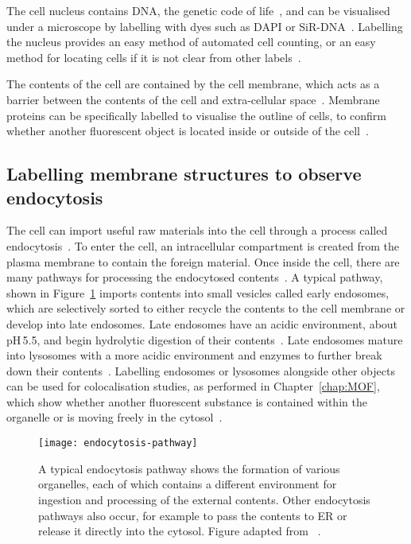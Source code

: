 The cell nucleus contains DNA, the genetic code of life~\cite{alberts2002molecular}, and can be visualised under a microscope by labelling with dyes such as DAPI or SiR-DNA~\cite{kapuscinski1995dapi, lukinavivcius2015sir}. 
Labelling the nucleus provides an easy method of automated cell counting, or an easy method for locating cells if it is not clear from other labels~\cite{porter1980use}. 

The contents of the cell are contained by the cell membrane, which acts as a barrier between the contents of the cell and extra-cellular space~\cite[\textit{ch. 1}]{alberts2013essential}. 
Membrane proteins can be specifically labelled to visualise the outline of cells, to confirm whether another fluorescent object is located inside or outside of the cell~\cite{yano2009tag, lee2011fluorescent, chamma2017optimized}. 

\subsection{Labelling membrane structures to observe endocytosis}
The cell can import useful raw materials into the cell through a process called endocytosis~\cite{alberts2002molecular}. 
To enter the cell, an intracellular compartment is created from the plasma membrane to contain the foreign material.
Once inside the cell, there are many pathways for processing the endocytosed contents~\cite{marsh2001endocytosis, marsh1999structural, mcmahon2011molecular}. 
A typical pathway, shown in Figure~\ref{fig:endocytosis-pathway} imports contents into small vesicles called early endosomes, which are selectively sorted to either recycle the contents to the cell membrane or develop into late endosomes. 
Late endosomes have an acidic environment, about pH\,\num{5.5}, and begin hydrolytic digestion of their contents~\cite{geisow1984ph}. 
Late endosomes mature into lysosomes with a more acidic environment and enzymes to further break down their contents~\cite{alberts2002molecular}. 
Labelling endosomes or lysosomes alongside other objects can be used for colocalisation studies, as performed in Chapter~\ref{chap:MOF}, which show whether another fluorescent substance is contained within the organelle or is moving freely in the cytosol~\cite{pike2017quantifying}. 

\begin{figure}[htbp!]
\centering
\texttt{[image: endocytosis-pathway]}
\captionsetup{singlelinecheck=off}
\caption[Introduction: Cells import external contents through endocytosis]{A typical endocytosis pathway shows the formation of various organelles, each of which contains a different environment for ingestion and processing of the external contents. Other endocytosis pathways also occur, for example to pass the contents to ER or release it directly into the cytosol. Figure adapted from ~\cite{alberts2002molecular}. } %
\label{fig:endocytosis-pathway}
\end{figure}

